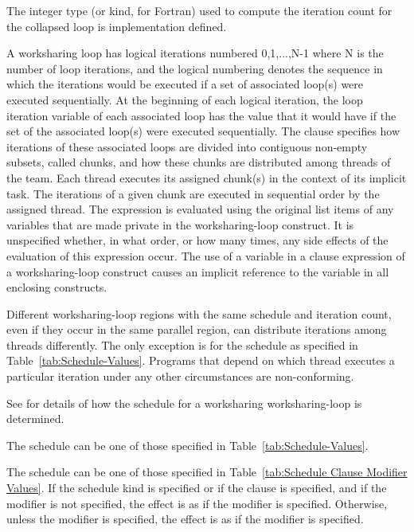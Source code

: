 The integer type (or kind, for Fortran) used to compute the iteration count
for the collapsed loop is implementation defined.

 A worksharing loop has
logical iterations numbered 0,1,...,N-1 where N is the number of loop
iterations, and the logical numbering denotes the sequence in which
the iterations would be executed if a set of associated loop(s) were
executed sequentially.  At the beginning of each logical iteration,
the loop iteration variable of each associated loop has the value that
it would have if the set of the associated loop(s) were executed
sequentially.  The  clause specifies how iterations of
these associated loops are divided into contiguous non-empty subsets,
called chunks, and how these chunks are distributed among threads of
the team. Each thread executes its assigned chunk(s) in the context of
its implicit task.  The iterations of a given chunk are executed in
sequential order by the assigned thread.  The 
expression is evaluated using the original list items of any variables
that are made private in the worksharing-loop construct. It is unspecified
whether, in what order, or how many times, any side effects of the
evaluation of this expression occur. The use of a variable in a
 clause expression of a worksharing-loop construct causes an
implicit reference to the variable in all enclosing constructs.

Different worksharing-loop regions with the same schedule and iteration count, even if
they occur in the same parallel region, can distribute iterations among
threads differently. The only exception is for the  schedule
as specified in Table~\ref{tab:Schedule-Values}. Programs that depend
on which thread executes a particular iteration under any other circumstances
are non-conforming.

See 
for details of how the schedule for a worksharing worksharing-loop is
determined.

The schedule  can be one of those specified in
Table~\ref{tab:Schedule-Values}.

The schedule  can be one of those specified in
Table~\ref{tab:Schedule Clause Modifier Values}. If the
 schedule kind is specified or if the 
clause is specified, and if the  modifier is
not specified, the effect is as if the  modifier
is specified. Otherwise, unless the  modifier is
specified, the effect is as if the  modifier
is specified.

